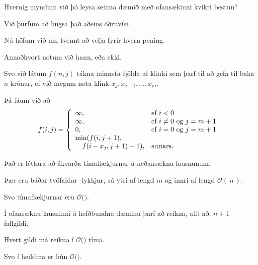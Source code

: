 {
    {
        \item<1-> Hvernig myndum við þó leysa seinna dæmið með ofansækinni kvikri bestun?
            \item<2-> Við þurfum að hugsa það aðeins öðruvísi.
            \item<3-> Nú höfum við um tvennt að velja fyrir hvern pening.
            \item<4-> Annaðhvort notum við hann, eða ekki.
            \item<5-> Svo við látum $f(n, j)$ tákna minnsta fjölda af klinki sem þarf til að gefa til baka $n$ krónur,
            ef við megum nota klink $x_j, x_{j + 1}, ..., x_m$.
                \item<6-> Þá fáum við að
                \[
                f(i, j) = \left \{
                    \env{array}
        {
            {l l}
            \infty, & \text{ef $i < 0$}\\
                \infty, & \text{ef $i \neq 0$ og $j = m + 1$}\\
                0, & \text{ef $i = 0$ og $j = m + 1$}\\
                \text{min}(f(i, j + 1), &\\
                        \quad f(i - x_j, j + 1) + 1), & \text{annars.}\\
        }
        \right .
            \]
    }
}

{
}

{
    {
        \item<1-> Það er léttara að ákvarða tímaflækjurnar á neðansæknu lausnunum.
            \item<2-> Þær eru báðar tvöfaldar -lykkjur, sú ytri af lengd $m$ og innri af lengd $\mathcal{O}(\,n\,)$.
            \item<3-> Svo tímaflækjurnar eru $\mathcal{O}($$)$.
    }
}

{
    {
        \item<1-> Í ofansæknu lausninni á hefðbundna dæminu þarf að reikna, allt að, $n + 1$ fallgildi.
            \item<2-> Hvert gildi má reikna í $\mathcal{O}($$)$ tíma.
            \item<4-> Svo í heildina er hún $\mathcal{O}($$)$.
            \item<1->[] 
    }
}

